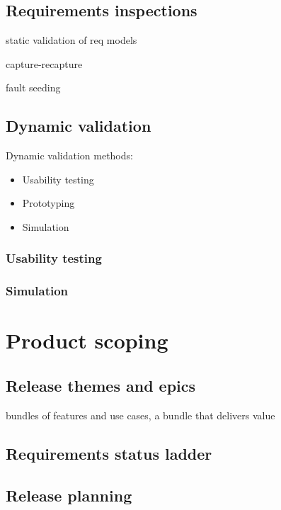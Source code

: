 \documentclass{reqengbook}
\begin{document}

\section{Requirements inspections}
static validation of req models

capture-recapture

fault seeding

\section{Dynamic validation}

Dynamic validation methods:
\begin{itemize}
  \item Usability testing
  \item Prototyping
  \item Simulation
\end{itemize}

\subsection{Usability testing}

\subsection{Simulation}


\chapter{Product scoping}

\section{Release themes and epics}

bundles of features and use cases, a bundle that delivers value

\section{Requirements status ladder}

\section{Release planning} 
\end{document}
